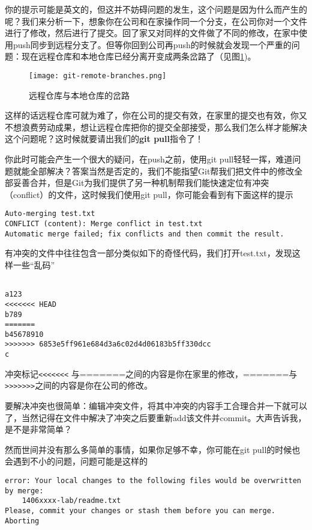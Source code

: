 你的提示可能是英文的，但这并不妨碍问题的发生，这个问题是因为什么而产生的呢？我们来分析一下，想象你在公司和在家操作同一个分支，在公司你对一个文件进行了修改，然后进行了提交。回了家又对同样的文件做了不同的修改，在家中使用push同步到远程分支了。但等你回到公司再push的时候就会发现一个严重的问题：现在远程仓库和本地仓库已经分离开变成两条岔路了（见图\ref{git-remote-branches.png})。

\begin{figure}[htbp]
  \centering
  \texttt{[image: git-remote-branches.png]}
  \caption{远程仓库与本地仓库的岔路}\label{git-remote-branches.png}
\end{figure}

这样的话远程仓库可就为难了，你在公司的提交有效，在家里的提交也有效，你又不想浪费劳动成果，想让远程仓库把你的提交全部接受，那么我们怎么样才能解决这个问题呢？这时候就要请出我们的\textbf{git pull}指令了！

你此时可能会产生一个很大的疑问，在push之前，使用git pull轻轻一挥，难道问题就能全部解决？答案当然是否定的，我们不能指望Git帮我们把文件中的修改全部妥善合并，但是Git为我们提供了另一种机制帮我们能快速定位有冲突（conflict）的文件，这时候我们使用git pull，你可能会看到有下面这样的提示

\begin{verbatim}
Auto-merging test.txt
CONFLICT (content): Merge conflict in test.txt
Automatic merge failed; fix conflicts and then commit the result.
\end{verbatim}

有冲突的文件中往往包含一部分类似如下的奇怪代码，我们打开test.txt，发现这样一些“乱码”

\begin{verbatim}

a123
<<<<<<< HEAD
b789
=======
b45678910
>>>>>>> 6853e5ff961e684d3a6c02d4d06183b5ff330dcc
c
\end{verbatim}

冲突标记\verb|<<<<<<<| 与=======之间的内容是你在家里的修改，=======与\verb|>>>>>>>|之间的内容是你在公司的修改。

要解决冲突也很简单：编辑冲突文件，将其中冲突的内容手工合理合并一下就可以了，当然记得在文件中解决了冲突之后要重新add该文件并commit。大声告诉我，是不是非常简单？

然而世间并没有那么多简单的事情，如果你足够不幸，你可能在git pull的时候也会遇到不小的问题，问题可能是这样的

\begin{verbatim}
error: Your local changes to the following files would be overwritten by merge:
	1406xxxx-lab/readme.txt
Please, commit your changes or stash them before you can merge.
Aborting
\end{verbatim}


